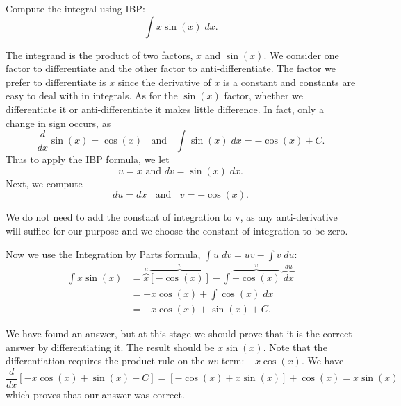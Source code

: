 \documentclass{ximera}
\begin{document}
\begin{example} %
Compute the integral using IBP:
  \[
  \int x\sin(x) \;dx.
  \]
  
  The integrand is the product of two factors, $x$ and $\sin(x)$.  We consider one factor to differentiate and the other factor to anti-differentiate.
  The factor we prefer to differentiate is $x$ since the derivative of $x$ is a constant and constants are easy to deal with in integrals.
  As for the $\sin(x)$ factor, whether we differentiate it or anti-differentiate it makes little difference.  In fact, only a change in sign occurs,
  as 
  \[\frac{d}{dx}{\sin(x)} = \cos(x) \;\;  \text{ and }\;\;   \int \sin(x) \;dx = -\cos(x) + C.\]
  Thus to apply the IBP formula, we let
  \[u=x \text{  and  }  dv = \sin(x) \;dx.\]
  Next, we compute
  \[du = dx  \;\;  \text{  and  }\;\;    v = -\cos(x).\]
  \begin{remark} 
  We do not need to add the constant of integration to v, as any anti-derivative will suffice 
  for our purpose and we choose the constant of integration to be zero.
  \end{remark}
  Now we use the Integration by Parts formula, $\int u\;dv = uv-\int v\; du$:
  \begin{align*}
  \int x\sin(x) &= \overbrace{x}^{u}\overbrace{[-\cos(x)]}^{v} - \int \overbrace{-\cos(x)}^{v} \;\overbrace{dx}^{du}\\
                &= -x\cos(x) + \int \cos(x) \;dx\\
                &= -x\cos(x) + \sin(x) + C.
 \end{align*}
 
  We have found an answer, but at this stage we should prove that it is the correct answer by differentiating it.  The result should be $x\sin(x)$.
  Note that the differentiation requires the product rule on the $uv$ term: $-x\cos(x)$.
  We have
  \[
  \frac{d}{dx}{\left[-x\cos(x) + \sin(x) + C\right]} = [-\cos(x) + x\sin(x)] + \cos(x) = x\sin(x)
  \]
  which proves that our answer was correct.
  
    
\end{example}

\begin{center}
\begin{foldable}
\end{foldable}
\end{center}
\end{document}
